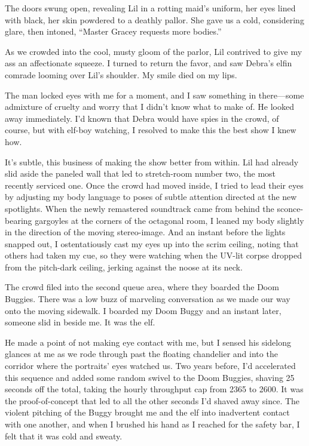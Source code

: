 The doors swung open, revealing Lil in a rotting maid's uniform,
her eyes lined with black, her skin powdered to a deathly pallor.
She gave us a cold, considering glare, then intoned, “Master Gracey
requests more bodies.”

As we crowded into the cool, musty gloom of the parlor, Lil
contrived to give my ass an affectionate squeeze. I turned to
return the favor, and saw Debra's elfin comrade looming over Lil's
shoulder. My smile died on my lips.

The man locked eyes with me for a moment, and I saw something in
there—some admixture of cruelty and worry that I didn't know what
to make of. He looked away immediately. I'd known that Debra would
have spies in the crowd, of course, but with elf-boy watching, I
resolved to make this the best show I knew how.

It's subtle, this business of making the show better from within.
Lil had already slid aside the paneled wall that led to
stretch-room number two, the most recently serviced one. Once the
crowd had moved inside, I tried to lead their eyes by adjusting my
body language to poses of subtle attention directed at the new
spotlights. When the newly remastered soundtrack came from behind
the sconce-bearing gargoyles at the corners of the octagonal room,
I leaned my body slightly in the direction of the moving
stereo-image. And an instant before the lights snapped out, I
ostentatiously cast my eyes up into the scrim ceiling, noting that
others had taken my cue, so they were watching when the UV-lit
corpse dropped from the pitch-dark ceiling, jerking against the
noose at its neck.

The crowd filed into the second queue area, where they boarded the
Doom Buggies. There was a low buzz of marveling conversation as we
made our way onto the moving sidewalk. I boarded my Doom Buggy and
an instant later, someone slid in beside me. It was the elf.

He made a point of not making eye contact with me, but I sensed his
sidelong glances at me as we rode through past the floating
chandelier and into the corridor where the portraits' eyes watched
us. Two years before, I'd accelerated this sequence and added some
random swivel to the Doom Buggies, shaving 25 seconds off the
total, taking the hourly throughput cap from 2365 to 2600. It was
the proof-of-concept that led to all the other seconds I'd shaved
away since. The violent pitching of the Buggy brought me and the
elf into inadvertent contact with one another, and when I brushed
his hand as I reached for the safety bar, I felt that it was cold
and sweaty.

